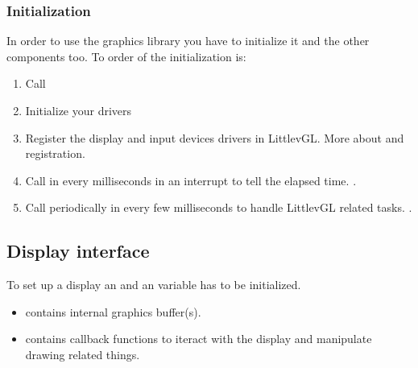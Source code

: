 \documentclass[letterpaper,10pt,english]{sphinxmanual}
\begin{document}
\subsubsection{Initialization}
\label{\detokenize{porting/project:initialization}}
In order to use the graphics library you have to initialize it and the other components too. To order of the initialization is:
\begin{enumerate}
\def\theenumi{\arabic{enumi}}
\def\labelenumi{\theenumi .}
\makeatletter\def\p@enumii{\p@enumi \theenumi .}\makeatother
\item {} 
Call 

\item {} 
Initialize your drivers

\item {} 
Register the display and input devices drivers in LittlevGL.  More about {\hyperref[\detokenize{porting/display::doc}]{}} and {\hyperref[\detokenize{porting/indev::doc}]{}} registration.

\item {} 
Call  in every  milliseconds in an interrupt to tell the elapsed time. {\hyperref[\detokenize{porting/tick::doc}]{}}.

\item {} 
Call  periodically in every few milliseconds to handle LittlevGL related tasks. {\hyperref[\detokenize{porting/task-handler::doc}]{}}.

\end{enumerate}


\subsection{Display interface}
\label{\detokenize{porting/display:display-interface}}\label{\detokenize{porting/display::doc}}
To set up a display an  and an  variable has to be initialized.
\begin{itemize}
\item {} 
 contains internal graphics buffer(s).

\item {} 
 contains callback functions to iteract with the display and manipulate drawing related things.

\end{itemize}
\end{document}
